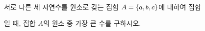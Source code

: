 서로 다른 세 자연수를 원소로 갖는 집합 $A=\{a{,}\mkern3mu\mathopen{}b{,}\mkern3mu\mathopen{}c\}$에 대하여 집합\par\smallskip{}\par\smallskip\noindent 일 때, 집합 $A$의 원소 중 가장 큰 수를 구하시오.
